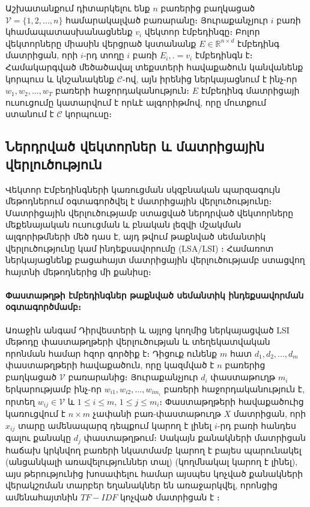 \documentclass[11pt]{article}
\begin{document}
\par Աշխատանքում դիտարկելու ենք $n$ բառերից բաղկացած $\mathcal{V}=  \{1, 2, ..., n  \}$ համարակալված բառարանը։ Յուրաքանչյուր $i$ բառի կհամապատասխանացնենք $v_{i}$ վեկտոր էմբեդինգը։ Բոլոր վեկտորները միասին վերցրած կստանանք $E \in \mathbb{R}^ { n \times d}$ էմբեդինգ մատրիցան, որի $i$-րդ տողը $i$ բառի $E_i, . = v_{i}$ էմբեդինգն է։ Համակարգված մեծածավալ տեքստերի հավաքածուն կանվանենք կորպուս և կնշանակենք $\mathcal{C}$-ով, այն իրենից ներկայացնում է ինչ-որ  $w_1, w_2, ..., w_T$ բառերի հաջորդականություն։ $E$ էմբեդինգ մատրիցայի ուսուցումը կատարվում է որևէ ալգորիթմով, որը մուտքում ստանում է $\mathcal{C}$ կորպուսը։

\newpage

\subsection*{\hfill Ներդրված վեկտորներ և մատրիցային վերլուծություն \hfill} \noindent
{}
{}

\par Վեկտոր Էմբեդինգների կառուցման սկզբնական պարզագույն մեթոդներում օգտագործվել է մատրիցային վերլուծությունը։ Մատրիցային վերլուծությամբ ստացված ներդրված վեկտորները մեքենայական ուսուցման և բնական լեզվի մշակման  ալգորիթմների մեծ դաս է, այդ թվում թաքնված սեմանտիկ վերլուծությունը կամ ինդեքսավորումը (LSA/LSI) ։ Համառոտ ներկայացնենք բացահայտ մատրիցային վերլուծությամբ ստացվող հայտնի մեթոդներից մի քանիսը։

\paragraph{Փաստաթղթի էմբեդինգներ թաքնված սեմանտիկ ինդեքսավորման օգտագործմամբ։} Առաջին անգամ Դիրվեստերի\cite{bib_item_21} և այլոց կողմից ներկայացված LSI մեթոդը փաստաթղթերի վերլուծության և տեղեկատվական որոնման համար հզոր գործիք է։ Դիցուք ունենք $m$ հատ $d_1, d_2, ..., d_m$ փաստաթղթերի հավաքածուն, որը կազմված է $n$ բառերից բաղկացած $\mathcal{V}$ բառարանից։ Յուրաքանչյուր $d_i$ փաստաթուղթ $m_i$ երկարությամբ ինչ-որ $w_{i1}, w_{i2}, ..., w_{im_i}$ բառերի հաջորդականություն է, որտեղ $w_{ij} \in \mathcal{V}$ և $1\leq i \leq m$, $1\leq j \leq m_i$։ Փաստաթղթերի հավաքածուից կառուցվում է $n \times m$ չափանի բառ-փաստաթուղթ $X$  մատրիցան, որի $x_{ij}$ տարը ամենապարզ դեպքում կարող է լինել $i$-րդ բառի հանդես գալու քանակը $d_j$ փաստաթղթում։ Սակայն քանակների մատրիցան հաճախ կրկնվող բառերի նկատմամբ կարող է  բայես պարունակել (անցանկալի առավելություններ տալ) (կողմնակալ կարող է լինել), այս թերությունից խոսափելու համար այսպես կոչված քանակների վերակշռման տարբեր եղանակներ են առաջարկվել, որոնցից ամենահայտնին $TF-IDF$ կոչված մատրիցան է \cite{bib_item_3, bib_item_16}։ 
\end{document}
